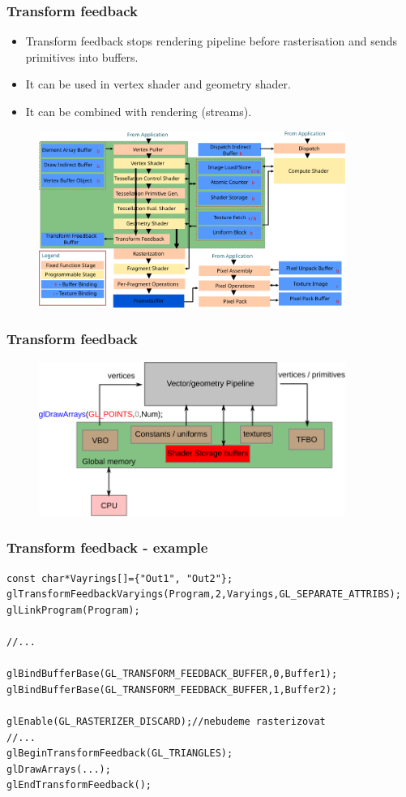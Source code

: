 
\begin{frame}
\frametitle{Transform feedback}
	\begin{itemize}
  \item Transform feedback stops rendering pipeline before rasterisation and sends primitives into buffers.
	\item It can be used in vertex shader and geometry shader.
  \item It can be combined with rendering (streams).
	\end{itemize}
	\begin{figure}[h]
	\includegraphics[width=10cm,keepaspectratio]{pics/tf_pipeline}
	\end{figure}
\end{frame}

\begin{frame}
\frametitle{Transform feedback}
	\begin{figure}[h]
	\includegraphics[width=10cm,keepaspectratio]{pics/tf_mem}
	\end{figure}
\end{frame}

\begin{frame}[fragile]
\frametitle{Transform feedback - example}
{\scriptsize
\begin{verbatim}
const char*Vayrings[]={"Out1", "Out2"};
glTransformFeedbackVaryings(Program,2,Varyings,GL_SEPARATE_ATTRIBS);
glLinkProgram(Program);

//...

glBindBufferBase(GL_TRANSFORM_FEEDBACK_BUFFER,0,Buffer1);
glBindBufferBase(GL_TRANSFORM_FEEDBACK_BUFFER,1,Buffer2);

glEnable(GL_RASTERIZER_DISCARD);//nebudeme rasterizovat
//...
glBeginTransformFeedback(GL_TRIANGLES);
glDrawArrays(...);
glEndTransformFeedback();
\end{verbatim}
}
\end{frame}

